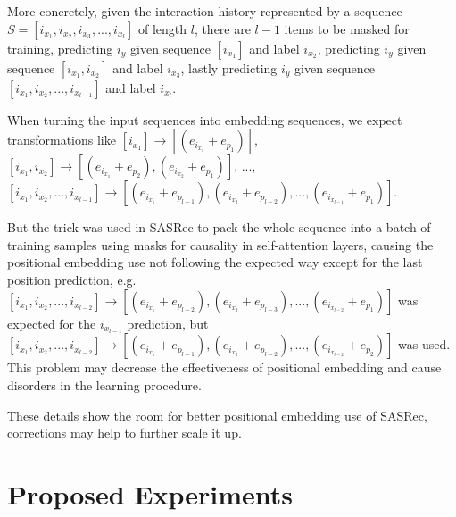 \documentclass{article}
\begin{document}
More concretely, given the interaction history represented by a sequence $S = [i_{x_1}, i_{x_2}, i_{x_3}, ..., i_{x_l}]$ of length $l$,
there are $l-1$ items to be masked for training,
predicting $i_y$ given sequence $[i_{x_1}]$ and label $i_{x_2}$,
predicting $i_y$ given sequence $[i_{x_1}, i_{x_2}]$ and label $i_{x_3}$,
lastly predicting $i_y$ given sequence $[i_{x_1}, i_{x_2}, ..., i_{x_{l-1}}]$ and label $i_{x_l}$.

When turning the input sequences into embedding sequences, we expect transformations like
$[i_{x_1}] \xrightarrow{} [(e_{i_{x_1}} + e_{p_1})]$,
$[i_{x_1}, i_{x_2}] \xrightarrow{} [(e_{i_{x_1}} + e_{p_2}),  (e_{i_{x_2}} + e_{p_1})]$,
...,
$[i_{x_1}, i_{x_2}, ..., i_{x_{l-1}}] \xrightarrow{} [(e_{i_{x_1}} + e_{p_{l-1}}),  (e_{i_{x_2}} + e_{p_{l-2}}), ..., (e_{i_{x_{l-1}}} + e_{p_1})]$.

But the trick was used in SASRec to pack the whole sequence into a batch of training samples using masks for causality in self-attention layers,
causing the positional embedding use not following the expected way except for the last position prediction, e.g.
$[i_{x_1}, i_{x_2}, ..., i_{x_{l-2}}] \xrightarrow{} [(e_{i_{x_1}} + e_{p_{l-2}}),  (e_{i_{x_2}} + e_{p_{l-3}}), ..., (e_{i_{x_{l-2}}} + e_{p_1})]$ was expected for the $i_{x_{l-1}}$ prediction,
but $[i_{x_1}, i_{x_2}, ..., i_{x_{l-2}}] \xrightarrow{} [(e_{i_{x_1}} + e_{p_{l-1}}),  (e_{i_{x_2}} + e_{p_{l-2}}), ..., (e_{i_{x_{l-2}}} + e_{p_2})]$ was used.
This problem may decrease the effectiveness of positional embedding and cause disorders in the learning procedure.

These details show the room for better positional embedding use of SASRec, corrections may help to further scale it up.










\section{Proposed Experiments}
\end{document}
